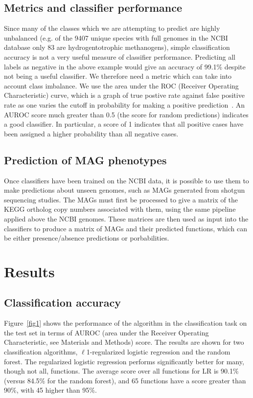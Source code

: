 \documentclass[10pt,letterpaper]{article}
\begin{document}
\subsection*{Metrics and classifier performance}
Since many of the classes which we are attempting to predict are highly unbalanced (e.g. of the 9407 unique species with full genomes in the NCBI database only 83 are hydrogentotrophic methanogens), simple classification accuracy is not a very useful measure of classifier performance. Predicting all labels as negative in the above example would give an accuracy of 99.1\% despite not being a useful classifier. We therefore need a metric which can take into account class imbalance. We use the area under the ROC (Receiver Operating Characteristic) curve, which is a graph of true postive rate against false positive rate as one varies the cutoff in probability for making a positive prediction~\cite{Fawcett2006,Flach2011}. An AUROC score much greater than 0.5 (the score for random predictions) indicates a good classifier. In particular, a score of 1 indicates that all positive cases have been assigned a higher probability than all negative cases.

\subsection*{Prediction of MAG phenotypes}
Once classifiers have been trained on the NCBI data, it is possible to use them to make predictions about unseen genomes, such as MAGs generated from shotgun sequencing studies. The MAGs must first be processed to give a matrix of the KEGG ortholog copy numbers associated with them, using the same pipeline applied above the NCBI genomes. These matrices are then used as input into the classifiers to produce a matrix of MAGs and their predicted functions, which can be either presence/absence predictions or porbabilities. 


\section*{Results}
\subsection*{Classification accuracy}
Figure~\ref{fig1} shows the performance of the algorithm in the classification task on the test set in terms of AUROC (area under the Receiver Operating Characteristic, see Materials and Methods) score. The results are shown for two classification algorithms, $\ell$1-regularized logistic regression and the random forest. The regularized logistic regression performs significantly better for many, though not all, functions. The average score over all functions for LR is 90.1\% (versus 84.5\% for the random forest), and 65 functions have a score greater than 90\%, with 45 higher than 95\%.
\end{document}
